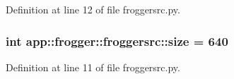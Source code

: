 Definition at line 12 of file froggersrc.py.
\subsubsection{\setlength{\rightskip}{0pt plus 5cm}int {\bf app::frogger::froggersrc::size} = 640\hspace{0.3cm}{\tt  [static]}}\label{namespaceapp_1_1frogger_1_1froggersrc_0fe75b946777488ee764dc2825af9d1e}




Definition at line 11 of file froggersrc.py.